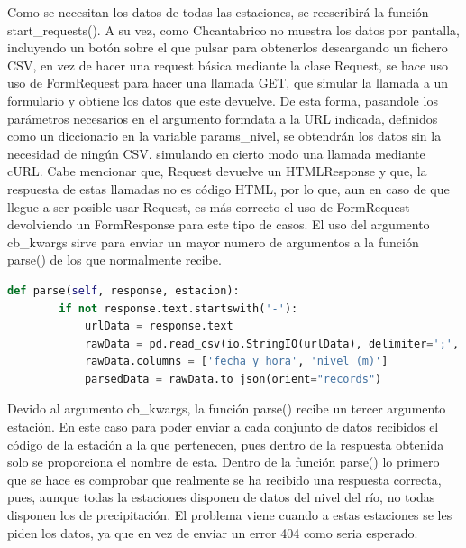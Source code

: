 Como se necesitan los datos de todas las estaciones, se reescribirá la función start\_requests().\newline
\newline
A su vez, como Chcantabrico no muestra los datos por pantalla, incluyendo un botón sobre el que pulsar para obtenerlos descargando un fichero CSV, en vez de hacer una request básica mediante la clase Request, se hace uso uso de FormRequest para hacer una llamada GET, que simular la llamada a un formulario y obtiene los datos que este devuelve.\newline
\newline
De esta forma, pasandole los parámetros necesarios en el argumento formdata a la URL indicada, definidos como un diccionario en la variable params\_nivel, se obtendrán los datos sin la necesidad de ningún CSV. simulando en cierto modo una llamada mediante cURL.\newline
\newline
Cabe mencionar que, Request devuelve un HTMLResponse y que, la respuesta de estas llamadas no es código HTML, por lo que, aun en caso de que llegue a ser posible usar Request, es más correcto el uso de FormRequest devolviendo un FormResponse para este tipo de casos.\newline
\newline
El uso del argumento cb\_kwargs sirve para enviar un mayor numero de argumentos a la función parse() de los que normalmente recibe.

\begin{lstlisting}[language=Python, caption={Función parse() Chcantabrico Nivel Spider}]
	def parse(self, response, estacion):
		if not response.text.startswith('-'):
			urlData = response.text
			rawData = pd.read_csv(io.StringIO(urlData), delimiter=';', encoding='utf-8', header=1)
			rawData.columns = ['fecha y hora', 'nivel (m)']
			parsedData = rawData.to_json(orient="records")
\end{lstlisting}

Devido al argumento cb\_kwargs, la función parse() recibe un tercer argumento estación. En este caso para poder enviar a cada conjunto de datos recibidos el código de la estación a la que pertenecen, pues dentro de la respuesta obtenida solo se proporciona el nombre de esta.\newline
\newline
Dentro de la función parse() lo primero que se hace es comprobar que realmente se ha recibido una respuesta correcta, pues, aunque todas la estaciones disponen de datos del nivel del río, no todas disponen los de precipitación. El problema viene cuando a estas estaciones se les piden los datos, ya que en vez de enviar un error 404 como seria esperado.

